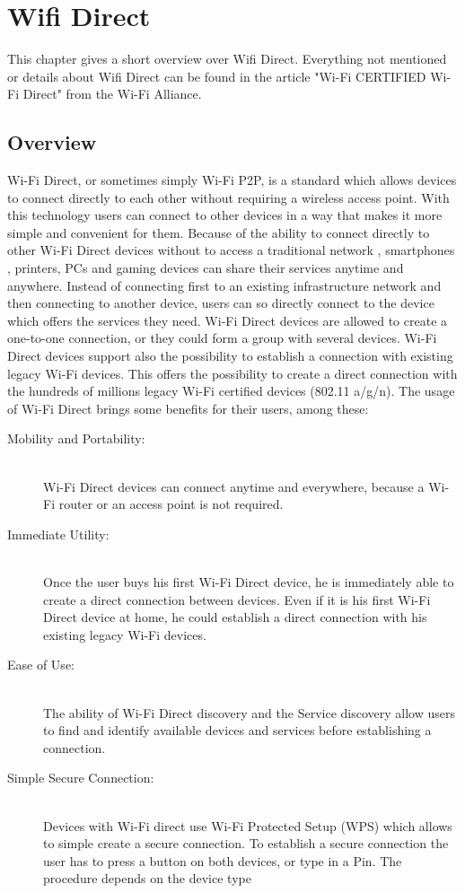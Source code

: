 \chapter{Wifi Direct}
\label{cha:WifiDirect}
This chapter gives a short overview over Wifi Direct. Everything not mentioned or details about Wifi Direct can be found in the article "Wi-Fi CERTIFIED Wi-Fi Direct" from the Wi-Fi Alliance.

\section{Overview}
\label{sec:Overview}
Wi-Fi Direct, or sometimes simply Wi-Fi P2P, is a standard which allows devices to connect directly to each other without requiring a wireless access point. With this technology users can connect to other devices in a way that makes it more simple and convenient for them. Because of the ability to connect directly to other Wi-Fi Direct devices without to access a traditional network , smartphones , printers, PCs and gaming devices can share their services anytime and anywhere. Instead of connecting first to an existing infrastructure network and then connecting to another device, users can so directly connect to the device which offers the services they need. Wi-Fi Direct devices are allowed to create a one-to-one connection, or they could form a group with several devices.
Wi-Fi Direct devices support also the possibility to establish a connection with existing legacy Wi-Fi devices. This offers the possibility to create a direct connection with the hundreds of millions legacy Wi-Fi certified devices (802.11 a/g/n). The usage of Wi-Fi Direct brings some benefits for their users, among these:\\
\begin{description}
  \item[Mobility and Portability:] \hfill \\ Wi-Fi Direct devices can connect anytime and everywhere, because a Wi-Fi router or an access point is not required.
  \item[Immediate Utility:] \hfill \\ Once the user buys his first Wi-Fi Direct device, he is immediately able to create a direct connection between devices. Even if it is his first Wi-Fi Direct device at home, he could establish a direct connection with his existing legacy Wi-Fi devices.
  \item[Ease of Use:] \hfill \\ The ability of Wi-Fi Direct discovery and the Service discovery allow users to find and identify available devices and services before establishing a connection.
  \item[Simple Secure Connection:] \hfill \\ Devices with Wi-Fi direct use Wi-Fi Protected Setup (WPS) which allows to simple create a secure connection. To establish a secure connection the user has to press a button on both devices, or type in a Pin. The procedure depends on the device type
\end{description}

